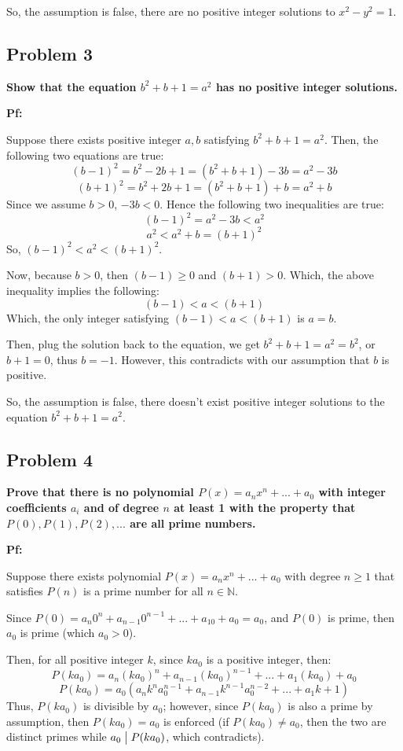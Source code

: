 \documentclass{article}
\begin{document}
So, the assumption is false, there are no positive integer solutions to $x^2-y^2=1$.

\hfill

\subsection{Problem 3}
\textbf{Show that the equation $b^2+b+1=a^2$ has no positive integer solutions.}

\textbf{Pf:}

Suppose there exists positive integer $a,b$ satisfying $b^2+b+1=a^2$. Then, the following two equations are true:
$$(b-1)^2  = b^2-2b+1 = (b^2+b+1)-3b = a^2-3b$$
$$(b+1)^2 = b^2+2b+1=(b^2+b+1)+b = a^2+b$$
Since we assume $b>0$, $-3b<0$. Hence the following two inequalities are true:
$$(b-1)^2 = a^2-3b < a^2$$
$$a^2 < a^2+b = (b+1)^2$$
So, $(b-1)^2<a^2<(b+1)^2$.

\hfill

Now, because $b>0$, then $(b-1)\geq 0$ and $(b+1)>0$. Which, the above inequality implies the following:
$$(b-1) < a < (b+1)$$
Which, the only integer satisfying $(b-1)<a<(b+1)$ is $a=b$.

Then, plug the solution back to the equation, we get $b^2+b+1=a^2=b^2$, or $b+1=0$, thus $b=-1$. However, this contradicts with our assumption that $b$ is positive. 

So, the assumption is false, there doesn't exist positive integer solutions to the equation $b^2+b+1=a^2$.

\hfill

\subsection{Problem 4}
\textbf{Prove that there is no polynomial $P(x)=a_nx^n+...+a_0$ with integer coefficients $a_i$ and of degree $n$ at least 1 with the property that $P(0), P(1), P(2),...$ are all prime numbers.}

\textbf{Pf:}

Suppose there exists polynomial $P(x)=a_nx^n+...+a_0$ with degree $n\geq 1$ that satisfies $P(n)$ is a prime number for all $n\in\mathbb{N}$.

\hfill

Since $P(0) = a_n0^n+a_{n-1}0^{n-1}+...+a_10+a_0 = a_0$, and $P(0)$ is prime, then $a_0$ is prime (which $a_0>0$).

Then, for all positive integer $k$, since $ka_0$ is a positive integer, then: 
$$P(ka_0) = a_n(ka_0)^n+a_{n-1}(ka_0)^{n-1}+...+a_1(ka_0)+a_0$$
$$P(ka_0) = a_0(a_nk^na_0^{n-1}+a_{n-1}k^{n-1}a_0^{n-2}+...+a_1k+1)$$
Thus, $P(ka_0)$ is divisible by $a_0$; however, since $P(ka_0)$ is also a prime by assumption, then $P(ka_0)=a_0$ is enforced (if $P(ka_0)\neq a_0$, then the two are distinct primes while $a_0\bigm| P(ka_0)$, which contradicts).
\end{document}
